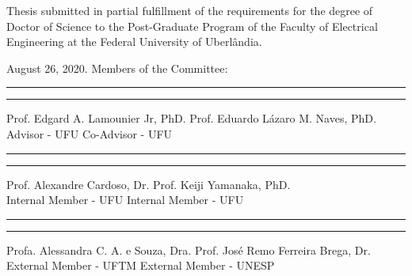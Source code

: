 
\newpage
\thispagestyle{empty}   %
\begin{center}
\ABNTEXchapterfont\large\imprimirautor
\vskip 4cm
\ABNTEXchapterfont\bfseries\Large\imprimirtitulo
\end{center}
\vskip 2cm


\hfill                                                         %
\begin{minipage}{11cm}
Thesis submitted in partial fulfillment of the requirements for the degree of Doctor of Science to the Post-Graduate Program of the Faculty of Electrical Engineering at the Federal University of Uberlândia.

\end{minipage}
\vskip 0.5cm
\noindent  August 26,  2020.
\vskip 0.5cm
\noindent Members of the Committee:
\vskip 1cm
\begin{flushleft}
\rule{7cm}{0.4mm}
\hskip 36pt
\rule{7.3cm}{0.4mm}
\end{flushleft}
\vspace{-0.5cm}
Prof. Edgard A. Lamounier Jr, PhD. \hskip 1.65cm Prof. Eduardo L{\'a}zaro M. Naves, PhD.\\
Advisor - UFU \hskip 5.6cm Co-Advisor - UFU \\
\vskip 0cm
\begin{flushleft}
\rule{7cm}{0.4mm}
\hskip 36pt
\rule{7.3cm}{0.4mm}
\end{flushleft}
\vspace{-0.5cm}
Prof. Alexandre Cardoso, Dr.  \hskip 3cm Prof. Keiji Yamanaka, PhD. \\
 Internal Member - UFU \hskip 4cm  Internal Member - UFU 
\vskip 0cm
\begin{flushleft}
\rule{7cm}{0.4mm}
\hskip 36pt
\rule{7.3cm}{0.4mm}
\end{flushleft}
\vspace{-0.5cm}
Profa. Alessandra C. A. e Souza, Dra.  \hskip 1.50cm Prof. José Remo Ferreira Brega, Dr.  \\
 External Member - UFTM \hskip 3.5cm    External Member - UNESP